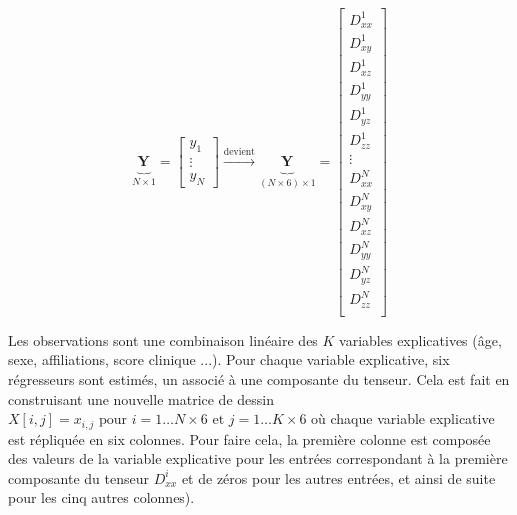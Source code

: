 \begin{equation}
    \underbrace{\mathbf{Y}_{}}_{N\times 1} = \left[\begin{array}{c}
                                             y_1\\
                                             \vdots\\
                                             y_N
                                         \end{array}\right]
  \xrightarrow{\text{devient}}
  \underbrace{\mathbf{Y}_{}}_{(N\times 6)\times 1} = \left[\begin{array}{c}
                                             D^1_{xx}\\
                                             D^1_{xy}\\
                                             D^1_{xz}\\
                                             D^1_{yy}\\
                                             D^1_{yz}\\
                                             D^1_{zz}\\
                                             \vdots\\
                                             D^N_{xx}\\
                                             D^N_{xy}\\
                                             D^N_{xz}\\
                                             D^N_{yy}\\
                                             D^N_{yz}\\
                                             D^N_{zz}\\
                                         \end{array}\right]
\end{equation}

Les observations sont une combinaison linéaire des $K$ variables explicatives (âge, sexe, affiliations, score clinique ...).
Pour chaque variable explicative, six régresseurs sont estimés, un associé à une composante du tenseur.
Cela est fait en construisant une nouvelle matrice de dessin $X\left[i,j\right] = x_{i,j}\text{ pour } i = 1\dots N\times 6\text{ et } j=1\dots K \times 6$
où chaque variable explicative est répliquée en six colonnes.
Pour faire cela, la première colonne est composée des valeurs de la variable explicative pour les entrées correspondant à la première composante du tenseur $D^i_{xx}$ et de zéros pour les autres entrées, et ainsi de suite pour les cinq autres colonnes).

